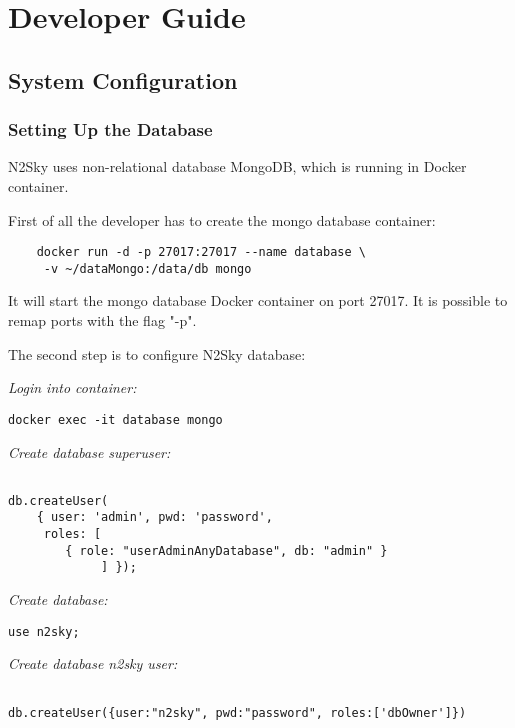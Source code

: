 \section{Developer Guide}\label{Developer Guide}

\subsection{System Configuration}\label{System configuration}

\subsubsection{Setting Up the Database}\label{database setup}

N2Sky uses non-relational database MongoDB, which is running in Docker container. 

First of all the developer has to create  the mongo database container:

 \begin{lstlisting}
	docker run -d -p 27017:27017 --name database \
	 -v ~/dataMongo:/data/db mongo
\end{lstlisting}

It will start the mongo database Docker container on port 27017. 
It is possible to remap ports with the flag "-p".

The second step is to configure N2Sky database:

\emph{Login into container:}  
 \begin{lstlisting}
docker exec -it database mongo
\end{lstlisting}

\emph{Create database superuser:}
 \begin{lstlisting}
 
db.createUser(
	{ user: 'admin', pwd: 'password',
	 roles: [
	 	{ role: "userAdminAnyDatabase", db: "admin" }
			 ] });

\end{lstlisting}



\emph{Create database:}
 \begin{lstlisting}
use n2sky;
\end{lstlisting}


\emph{Create database n2sky user:}
 \begin{lstlisting}
 
db.createUser({user:"n2sky", pwd:"password", roles:['dbOwner']})

\end{lstlisting}

